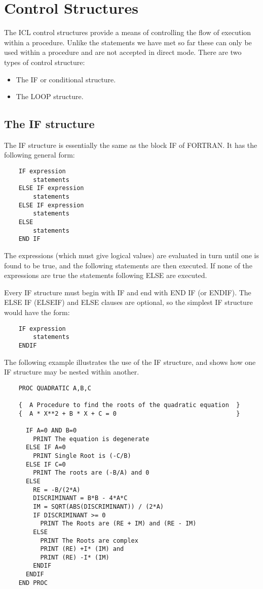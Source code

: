 \documentclass[twoside,11pt]{report}
\newcommand{\xlabel}[1]{}
\begin{document}
\section{\xlabel{control_structures}Control Structures}
The ICL control structures provide a means of controlling the flow of
execution within a procedure. Unlike the statements we have met so far
these can only be used within a procedure and are not accepted in direct mode.
There are two types of control structure:
\begin{itemize}
\item The IF or conditional structure.
\item The LOOP structure.
\end{itemize}
\subsection{\xlabel{the_if_structure}The IF structure}
The IF structure is essentially the same as the block IF of FORTRAN. It
has the following general form:
\begin{verbatim}
    IF expression
        statements
    ELSE IF expression
        statements
    ELSE IF expression
        statements
    ELSE
        statements
    END IF
\end{verbatim}
The expressions (which must give logical values) are evaluated in turn until
one is found to be true, and the following statements are then executed.
If none of the expressions
are true the statements following ELSE are executed.

Every IF structure must begin with IF and end with END IF (or ENDIF). The
ELSE IF (ELSEIF) and ELSE clauses are optional, so the simplest IF structure
would have the form:
\begin{verbatim}
    IF expression
        statements
    ENDIF
\end{verbatim}
The following example illustrates the use of the IF structure, and shows how
one IF structure may be nested within another.
\begin{verbatim}
    PROC QUADRATIC A,B,C
    
    {  A Procedure to find the roots of the quadratic equation  }
    {  A * X**2 + B * X + C = 0                                 }
    
      IF A=0 AND B=0
        PRINT The equation is degenerate
      ELSE IF A=0
        PRINT Single Root is (-C/B)
      ELSE IF C=0
        PRINT The roots are (-B/A) and 0
      ELSE
        RE = -B/(2*A)
        DISCRIMINANT = B*B - 4*A*C
        IM = SQRT(ABS(DISCRIMINANT)) / (2*A)
        IF DISCRIMINANT >= 0
          PRINT The Roots are (RE + IM) and (RE - IM)
        ELSE
          PRINT The Roots are complex
          PRINT (RE) +I* (IM) and
          PRINT (RE) -I* (IM)
        ENDIF
      ENDIF
    END PROC
\end{verbatim}
\end{document}
